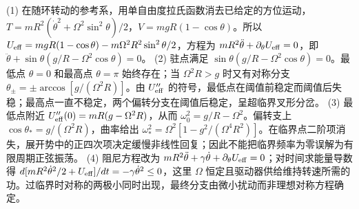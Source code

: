 (1) 在随环转动的参考系，用单自由度拉氏函数消去已给定的方位运动，\(T=mR^2(\dot\theta^2+\Omega^2\sin^2\theta)/2\)，\(V=mgR(1-\cos\theta)\)。所以 \(U_{\rm eff}=mgR(1-\cos\theta)-m\Omega^2R^2\sin^2\theta/2\)，方程为 \(mR^2\ddot\theta+\partial_\theta U_{\rm eff}=0\)，即 \(\ddot\theta+\sin\theta(g/R-\Omega^2\cos\theta)=0\)。
(2) 驻点满足 \(\sin\theta(g/R-\Omega^2\cos\theta)=0\)。最低点 \(\theta=0\) 和最高点 \(\theta=\pi\) 始终存在；当 \(\Omega^2R>g\) 时又有对称分支 \(\theta_\pm=\pm\arccos[g/(\Omega^2R)]\)。由 \(U_{\rm eff}''\) 的符号，最低点在阈值前稳定而阈值后失稳；最高点一直不稳定，两个偏转分支在阈值后稳定，呈超临界叉形分岔。
(3) 最低点附近 \(U_{\rm eff}''(0)=mR(g-\Omega^2R)\)，从而 \(\omega_0^2=g/R-\Omega^2\)。偏转支上 \(\cos\theta_* =g/(\Omega^2R)\)，曲率给出 \(\omega_*^2=\Omega^2[1-g^2/(\Omega^4R^2)]\)。在临界点二阶项消失，展开势中的正四次项决定缓慢非线性回复；因此不能把临界频率为零误解为有限周期正弦振荡。
(4) 阻尼方程改为 \(mR^2\ddot\theta+\gamma\dot\theta+\partial_\theta U_{\rm eff}=0\)；对时间求能量导数得 \(d[mR^2\dot\theta^2/2+U_{\rm eff}]/dt=-\gamma\dot\theta^2\le0\)，这里 \(\Omega\) 恒定且驱动器供给维持转速所需的功。过临界时对称的两极小同时出现，最终分支由微小扰动而非理想对称方程确定。
